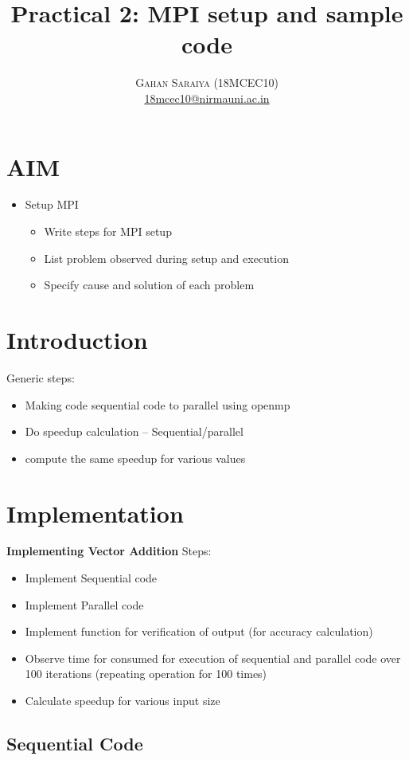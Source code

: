\documentclass[paper=letter, fontsize=12pt]{article}
\title{\vspace{-15mm}\fontsize{24pt}{10pt}\selectfont\textbf{Practical 2: MPI setup and sample code}} %
\author{
\large
{\textsc{Gahan Saraiya (18MCEC10)}}\\[2mm]
\normalsize \href{mailto:18mcec10@nirmauni.ac.in}{18mcec10@nirmauni.ac.in}\\[2mm] %
}
\date{}
\begin{document}
\maketitle %
\thispagestyle{fancy} %

\section{AIM}
\begin{itemize}
	\item Setup MPI
	\begin{itemize}
		\item Write steps for MPI setup
		\item List problem observed during setup and execution
		\item Specify cause and solution of each problem
	\end{itemize}
\end{itemize}

\section{Introduction}
Generic steps:
\begin{itemize}
	\item Making code sequential code to parallel using openmp
	\item Do speedup calculation -- Sequential/parallel	
	\item compute the same speedup for various values
\end{itemize}

\section{Implementation}
\textbf{Implementing Vector Addition}
Steps:
\begin{itemize}
	\item Implement Sequential code
	\item Implement Parallel code
	\item Implement function for verification of output (for accuracy calculation)
	\item Observe time for consumed for execution of sequential and parallel code over 100 iterations (repeating operation for 100 times)
	\item Calculate speedup for various input size
\end{itemize}
\subsection{Sequential Code}
\inputminted{c}{../src/main.c}
\end{document}
